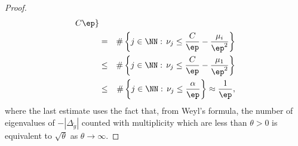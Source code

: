 \begin{proof}
\begin{eqnarray*}
        C\ep\}\\
                                 & = & \#\left\{j\in\NN:\,\nu_j\leq
                                 \frac{C}{\ep}-\frac{\mu_i}{\ep^2}\right\}\\
                                 & \leq & \#\left\{j\in\NN:\,\nu_j\leq
                                 \frac{C}{\ep}-\frac{\mu_1}{\ep^2}\right\}\\
                                 & \leq & \#\left\{j\in\NN:\,\nu_j\leq
                                     \frac{\alpha}{\ep}
                                 \right\}\approx \frac{1}{\ep},
    \end{eqnarray*}
    where the last estimate uses the fact that, from Weyl's formula, the number
    of eigenvalues of $-|\Delta_{\mathring g}|$ counted with multiplicity which
    are less than $\theta>0$ is equivalent to $\sqrt{\theta}$ as $\theta\to\infty$.

\end{proof}
